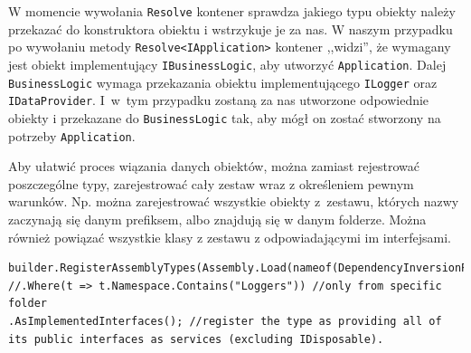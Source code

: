 W momencie wywołania \texttt{Resolve} kontener sprawdza jakiego typu obiekty należy przekazać do konstruktora obiektu i wstrzykuje je za nas. W naszym przypadku po wywołaniu metody \texttt{Resolve<IApplication>} kontener ,,widzi'', że wymagany jest obiekt implementujący \texttt{IBusinessLogic}, aby utworzyć \texttt{Application}. Dalej \texttt{BusinessLogic} wymaga przekazania obiektu implementującego \texttt{ILogger} oraz \texttt{IDataProvider}. I~w~tym przypadku zostaną za nas utworzone odpowiednie obiekty i przekazane do \texttt{BusinessLogic} tak, aby mógł on zostać stworzony na potrzeby \texttt{Application}.

Aby ułatwić proces wiązania danych obiektów, można zamiast rejestrować poszczególne typy, zarejestrować cały zestaw wraz z określeniem pewnym warunków. Np. można zarejestrować wszystkie obiekty z~zestawu, których nazwy zaczynają się danym prefiksem, albo znajdują się w danym folderze. Można również powiązać wszystkie klasy z zestawu z odpowiadającymi im interfejsami.
\begin{lstlisting}
builder.RegisterAssemblyTypes(Assembly.Load(nameof(DependencyInversionPrincipleLib)))
//.Where(t => t.Namespace.Contains("Loggers")) //only from specific folder
.AsImplementedInterfaces(); //register the type as providing all of its public interfaces as services (excluding IDisposable).

\end{lstlisting}